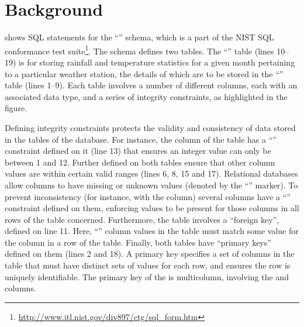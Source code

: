 
\vspace*{-1em}

\section{Background}
\label{sec:background}



\vspace{-2mm}
 shows SQL  statements for the ``\NistWeather'' schema, which is a part of the NIST SQL conformance test suite\footnote{\small{\url{http://www.itl.nist.gov/div897/ctg/sql_form.htm}}}. The schema defines two tables. The ``'' table (lines 10--19) is for storing rainfall and temperature statistics for a given month pertaining to a particular weather station, the details of which are to be  stored in the ``'' table (lines 1--9). Each table involves a number of different columns, each with an associated data type, and a series of integrity constraints, as highlighted in the figure.

Defining integrity constraints protects the validity and consistency of data stored in the tables of the database. For instance, the  column of the  table has a ``\CHECK'' constraint defined on it (line 13) that ensures an integer  value can only be between 1 and 12. Further \CCs defined on both tables ensure that other column values are within certain valid ranges (lines 6, 8, 15 and 17). Relational databases allow columns to have missing or unknown values (denoted by the ``\NULL'' marker). To prevent inconsistency (for instance, with the  column) several columns have a ``\NOTNULL'' constraint defined on them, enforcing values to be present for those columns in all rows of the table concerned.
Furthermore, the  table involves a ``foreign key'', defined on line 11. Here, ``'' column values in the  table must match some value
for the  column in a row of the  table. Finally, both tables have ``primary keys'' defined on them (lines 2 and 18). A primary key specifies a set of columns in the table that must have distinct sets of values for each row, and ensures the row is uniquely identifiable.
The primary key of the  is multicolumn, involving the  and  columns.

